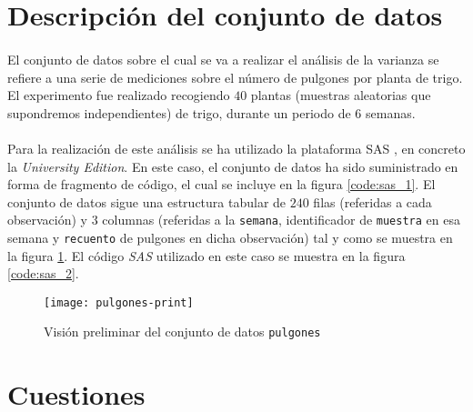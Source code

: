\documentclass[11pt]{article}
\begin{document}
  \maketitle



  \section{Descripción del conjunto de datos}
  \label{sec:description}

    \paragraph{}
    El conjunto de datos sobre el cual se va a realizar el análisis de la varianza se refiere a una serie de mediciones sobre el número de pulgones por planta de trigo. El experimento fue realizado recogiendo $40$ plantas (muestras aleatorias que supondremos independientes) de trigo, durante un periodo de $6$ semanas.

    \paragraph{}
    Para la realización de este análisis se ha utilizado la plataforma SAS \cite{sas}, en concreto la \emph{University Edition}. En este caso, el conjunto de datos ha sido suministrado en forma de fragmento de código, el cual se incluye en la figura \ref{code:sas_1}. El conjunto de datos sigue una estructura tabular de $240$ filas (referidas a cada observación) y $3$ columnas (referidas a la \texttt{semana}, identificador de \texttt{muestra} en esa semana y \texttt{recuento} de pulgones en dicha observación) tal y como se muestra en la figura \ref{img:pulgones-print}. El código \emph{SAS} utilizado en este caso se muestra en la figura \ref{code:sas_2}.

    \begin{figure}[!h]
      \centering
      \texttt{[image: pulgones-print]}
      \caption{Visión preliminar del conjunto de datos \texttt{pulgones}}
      \label{img:pulgones-print}
    \end{figure}

  \section{Cuestiones}
  \label{sec:questions}
\end{document}

